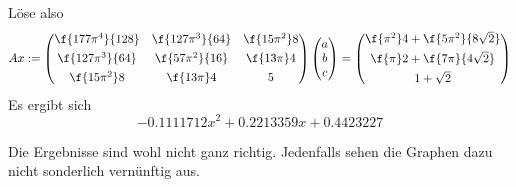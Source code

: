 \documentclass{scrartcl}
\begin{document}
\begin{aufgabe}
\begin{enumerate}
\[				\]
				Löse also
				\[
					Ax := \begin{pmatrix}\f{177\pi^4}{128} & \f{127\pi^3}{64} & \f{15\pi^2}8\\[0.4em]\f{127\pi^3}{64} & \f{57\pi^2}{16} & \f{13\pi}4\\[0.4em] \f{15\pi^2}8 & \f{13\pi}4 & 5\end{pmatrix}\begin{pmatrix}a\\b\\c\end{pmatrix} = \begin{pmatrix}\f{\pi^2}4+\f{5\pi^2}{8\sqrt{2}}\\[0.4em]\f{\pi}2+\f{7\pi}{4\sqrt{2}}\\[0.4em]1+\sqrt{2}\end{pmatrix}
				\]
				Es ergibt sich
				\[
					-0.1111712x^2 + 0.2213359x + 0.4423227
				\]
		\end{enumerate}
		\begin{note}
			Die Ergebnisse sind wohl nicht ganz richtig.
			Jedenfalls sehen die Graphen dazu nicht sonderlich vernünftig aus.
		\end{note}
	\end{aufgabe}
	\newpage
\end{document}

